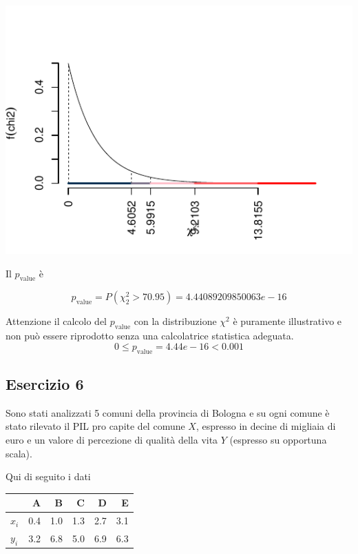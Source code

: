 \documentclass[
  11pt,
]{book}
\theoremstyle{mytheoremstyle}
\theoremstyle{mydefstyle}
\newenvironment{sol}
  {
  \begin{tcolorbox}[enhanced,breakable,arc=0.1mm,boxrule=1pt,colback=white,colframe=iblue,
  title=\bf \fontfamily{lmss}\selectfont \hspace{.5 cm} Soluzione,drop fuzzy shadow]

}{
\end{tcolorbox}
  }
\begin{document}
\begin{sol}
\begin{center}\includegraphics{Esami_passati_con_soluzioni_files/figure-latex/2022-87-1} \end{center}

Il \(p_{\text{value}}\) è

\[ p_{\text{value}} = P(\chi^2_{2}>70.95)=4.44089209850063e-16 \]

Attenzione il calcolo del \(p_\text{value}\) con la distribuzione \(\chi^2\) è puramente illustrativo e non può essere riprodotto senza una calcolatrice statistica adeguata.\[
 0 \leq p_\text{value}= 4.44e-16 < 0.001 
\]

\end{sol}

\subsection{Esercizio 6}\label{esercizio-6-14}

Sono stati analizzati 5 comuni della provincia di Bologna e su ogni comune è stato rilevato
il PIL pro capite del comune \(X\), espresso in decine di migliaia di euro e un valore di percezione di
qualità della vita \(Y\) (espresso su opportuna scala).

Qui di seguito i dati

\begin{table}[H]
\centering
\begin{tabular}{lrrrrr}
\toprule
  & A & B & C & D & E\\
\midrule
$x_i$ & 0.4 & 1.0 & 1.3 & 2.7 & 3.1\\
$y_i$ & 3.2 & 6.8 & 5.0 & 6.9 & 6.3\\
\bottomrule
\end{tabular}
\end{table}
\end{document}
